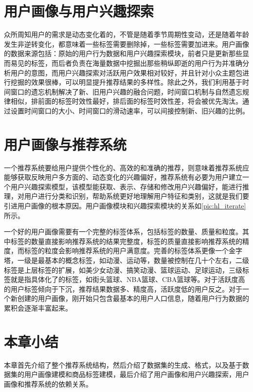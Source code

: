   \section{用户画像与用户兴趣探索}
  众所周知用户的需求是动态变化着的，不管是随着季节周期性变动，还是随着年龄发生非逆转变化，都意味着一些标签需要删除掉，一些标签需要加进来。用户画像的数据来源包括：原始的用户行为数据和用户兴趣探索模块，前者只是更新那些显而易见的标签，而后者负责在海量数据中挖掘出那些稍纵即逝的用户行为并准确分析用户的意图，而用户兴趣探索对活跃用户效果相对较好，并且针对小众主题包进行挖掘的效果很棒，可以明显提升推荐结果的多样性。除此之外，我们利用基于时间窗口的遗忘机制解决了新、旧用户兴趣的融合问题，时间窗口机制与自然遗忘规律相似，排前面的标签时效性最好，排后面的标签时效性差，将会被优先淘汰。通过设置时间窗口的大小、时间窗口的滑动速率，可以间接控制新、旧兴趣的比例。

  \section{用户画像与推荐系统}
  一个推荐系统要给用户提供个性化的、高效的和准确的推荐，则意味着推荐系统应能够获取反映用户多方面的、动态变化的兴趣偏好，推荐系统有必要为用户建立一个用户兴趣探索模型，该模型能获取、表示、存储和修改用户兴趣偏好，能进行推理，对用户进行分类和识别，帮助系统更好地理解用户特征和类别，这就是我们要引进用户画像的根本原因。用户画像模块和兴趣探索模块的关系如\autoref{pic:hl_iterate}所示。
  \begin{figure}
    \centering
      \label{pic:hl_iterate}
  \end{figure}

  一个好的用户画像需要有一个完整的标签体系，包括标签的数量、质量和粒度。其中标签的数量直接影响推荐系统的结果完整度，标签的质量直接影响推荐系统的精度，而标签的粒度会影响推荐系统的用户满意度。完善的标签体系更像一个金字塔，一级是最基本的概念标签，如动漫、运动等，数量被控制在几十个左右，二级标签是上层标签的扩展，如美少女动漫、搞笑动漫、篮球运动、足球运动，三级标签就是指具体化了的标签，如街头篮球、NBA篮球、CBA篮球等。对于活跃度高的用户标签倾向于下沉，推荐结果数据多、精度高，活跃度低的用户反之。对于一个新创建的用户画像，刚开始只包含最基本的用户人口信息，随着用户行为数据的累积会逐渐丰富起来。

  \section{本章小结}
  本章首先介绍了整个推荐系统结构，然后介绍了数据集的生成、格式，以及基于数据集的用户画像建模和商品标签建模，最后介绍了用户画像和用户兴趣探索，用户画像和推荐系统的依赖关系。